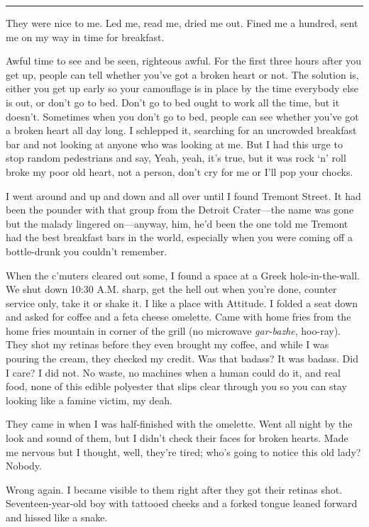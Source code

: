 \fancybreak{* * *}

They were nice to me. Led me, read me, dried me out. Fined me a hundred, sent me on my way in time for breakfast.

Awful time to see and be seen, righteous awful. For the first three hours after you get up, people can tell whether you've got a broken heart or not. The solution is, either you get up  early so your camouflage is in place by the time everybody else is out, or don't go to bed. Don't go to bed ought to work all the time, but it doesn't. Sometimes when you don't go to bed, people can see whether you've got a broken heart all day long. I schlepped it, searching for an uncrowded breakfast bar and not looking at anyone who was looking at me. But I had this urge to stop random pedestrians and say, Yeah, yeah, it's true, but it was rock `n' roll broke my poor old heart, not a person, don't cry for me or I'll pop your chocks.

I went around and up and down and all over until I found Tremont Street. It had been the pounder with that group from the Detroit Crater—the name was gone but the malady lingered on—anyway, him, he'd been the one told me Tremont had the best breakfast bars in the world, especially when you were coming off a bottle-drunk you couldn't remember.

When the c'muters cleared out some, I found a space at a Greek hole-in-the-wall. We shut down 10:30 A.M. sharp, get the hell out when you're done, counter service only, take it or shake it. I like a place with Attitude. I folded a seat down and asked for coffee and a feta cheese omelette. Came with home fries from the home fries mountain in corner of the grill (no microwave \textit{gar-bazhe}, hoo-ray). They shot my retinas before they even brought my coffee, and while I was pouring the cream, they checked my credit. Was that badass? It was badass. Did I care? I did not. No waste, no machines when a human could do it, and real food, none of this edible polyester that slips clear through you so you can stay looking like a famine victim, my deah.

They came in when I was half-finished with the omelette. Went all night by the look and sound of them, but I didn't check their faces for broken hearts. Made me nervous but I thought, well, they're tired; who's going to notice this old lady? Nobody.

Wrong again. I became visible to them right after they got their retinas shot. Seventeen-year-old boy with tattooed cheeks and a forked tongue leaned forward and hissed like a snake.

